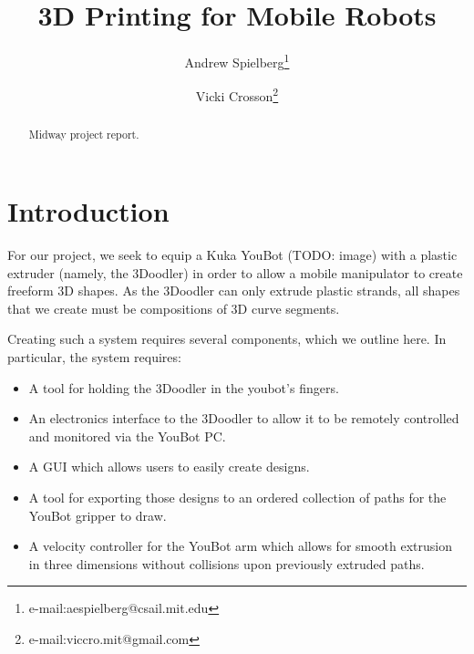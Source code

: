 \documentclass[conference]{acmsiggraph}
\title{3D Printing for Mobile Robots}
\author{Andrew Spielberg\thanks{e-mail:aespielberg@csail.mit.edu} \and Vicki Crosson\thanks{e-mail:viccro.mit@gmail.com}}
\begin{document}

\maketitle

\begin{abstract}

Midway project report.

\end{abstract}


\keywordlist


\TOGlinkslist


\copyrightspace

\section{Introduction}

For our project, we seek to equip a Kuka YouBot (TODO: image) with a plastic extruder (namely, the 3Doodler) in order to allow a mobile manipulator to create freeform 3D shapes.  As the 3Doodler can only extrude plastic strands, all shapes that we create must be compositions of 3D curve segments.

Creating such a system requires several components, which we outline here.  In particular, the system requires:

\begin{itemize}
\item A tool for holding the 3Doodler in the youbot's fingers.
\item An electronics interface to the 3Doodler to allow it to be remotely controlled and monitored via the YouBot PC.
\item A GUI which allows users to easily create designs.
\item A tool for exporting those designs to an ordered collection of paths for the YouBot gripper to draw.
\item A velocity controller for the YouBot arm which allows for smooth extrusion in three dimensions without collisions upon previously extruded paths.
\end{itemize}
\end{document}
